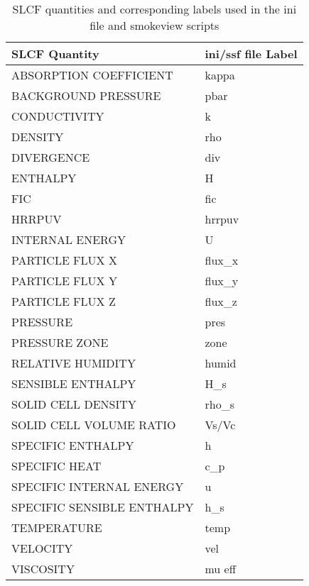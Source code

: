 \begin{table}[bph]
\begin{center}
\caption{SLCF quantities and corresponding labels used in the ini file and smokeview scripts}
\vspace{0.1in}
\begin{tabular}{|l|l|}
\hline
SLCF Quantity & ini/ssf file Label \\ \hline
{\ct  ABSORPTION COEFFICIENT } & {\ct   kappa } \\ \hline
{\ct  BACKGROUND PRESSURE } & {\ct   pbar } \\ \hline
{\ct  CONDUCTIVITY } & {\ct   k } \\ \hline
{\ct  DENSITY } & {\ct   rho } \\ \hline
{\ct  DIVERGENCE } & {\ct   div } \\ \hline
{\ct  ENTHALPY } & {\ct   H } \\ \hline
{\ct  FIC } & {\ct   fic } \\ \hline
{\ct  HRRPUV } & {\ct   hrrpuv } \\ \hline
{\ct  INTERNAL ENERGY } & {\ct   U } \\ \hline
{\ct  PARTICLE FLUX X } & {\ct   flux\_x } \\ \hline
{\ct  PARTICLE FLUX Y } & {\ct   flux\_y } \\ \hline
{\ct  PARTICLE FLUX Z } & {\ct   flux\_z } \\ \hline
{\ct  PRESSURE } & {\ct   pres } \\ \hline
{\ct  PRESSURE ZONE } & {\ct   zone } \\ \hline
{\ct  RELATIVE HUMIDITY } & {\ct   humid } \\ \hline
{\ct  SENSIBLE ENTHALPY } & {\ct   H\_s } \\ \hline
{\ct  SOLID CELL DENSITY } & {\ct   rho\_s } \\ \hline
{\ct  SOLID CELL VOLUME RATIO } & {\ct   Vs/Vc } \\ \hline
{\ct  SPECIFIC ENTHALPY } & {\ct   h } \\ \hline
{\ct  SPECIFIC HEAT } & {\ct   c\_p } \\ \hline
{\ct  SPECIFIC INTERNAL ENERGY } & {\ct   u } \\ \hline
{\ct  SPECIFIC SENSIBLE ENTHALPY } & {\ct   h\_s } \\ \hline
{\ct  TEMPERATURE } & {\ct   temp } \\ \hline
{\ct  VELOCITY } & {\ct   vel } \\ \hline
{\ct  VISCOSITY } & {\ct   mu eff } \\ \hline
\end{tabular}
\label{tabSLCF}
\end{center}
\end{table}
